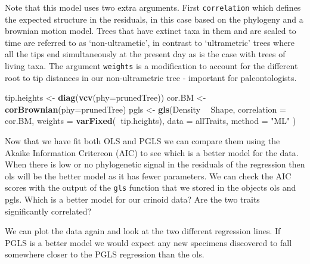 \documentclass[]{article}
\newenvironment{Shaded}{\begin{snugshade}}{\end{snugshade}}
\newcommand{\KeywordTok}[1]{\textcolor[rgb]{0.13,0.29,0.53}{\textbf{#1}}}
\newcommand{\DataTypeTok}[1]{\textcolor[rgb]{0.13,0.29,0.53}{#1}}
\newcommand{\StringTok}[1]{\textcolor[rgb]{0.31,0.60,0.02}{#1}}
\newcommand{\OperatorTok}[1]{\textcolor[rgb]{0.81,0.36,0.00}{\textbf{#1}}}
\newcommand{\NormalTok}[1]{#1}
\begin{document}
Note that this model uses two extra arguments. First
\texttt{correlation} which defines the expected structure in the
residuals, in this case based on the phylogeny and a brownian motion
model. Trees that have extinct taxa in them and are scaled to time are
referred to as `non-ultrametic', in contrast to `ultrametric' trees
where all the tips end simultaneously at the present day as is the case
with trees of living taxa. The argument \texttt{weights} is a
modification to account for the different root to tip distances in our
non-ultrametric tree - important for paleontologists.

\begin{Shaded}
\begin{Highlighting}[]
\NormalTok{tip.heights <-}\StringTok{ }\KeywordTok{diag}\NormalTok{(}\KeywordTok{vcv}\NormalTok{(}\DataTypeTok{phy=}\NormalTok{prunedTree))}
\NormalTok{cor.BM <-}\StringTok{ }\KeywordTok{corBrownian}\NormalTok{(}\DataTypeTok{phy=}\NormalTok{prunedTree)}
\NormalTok{pgls <-}\StringTok{ }\KeywordTok{gls}\NormalTok{(Density }\OperatorTok{~}\StringTok{ }\NormalTok{Shape, }
            \DataTypeTok{correlation =}\NormalTok{ cor.BM, }
            \DataTypeTok{weights =} \KeywordTok{varFixed}\NormalTok{(}\OperatorTok{~}\NormalTok{tip.heights), }
            \DataTypeTok{data =}\NormalTok{ allTraits, }
            \DataTypeTok{method =} \StringTok{"ML"}
\NormalTok{            )}
\end{Highlighting}
\end{Shaded}

Now that we have fit both OLS and PGLS we can compare them using the
Akaike Information Critereon (AIC) to see which is a better model for
the data. When there is low or no phylogenetic signal in the residuals
of the regression then ols will be the better model as it has fewer
parameters. We can check the AIC scores with the output of the
\texttt{gls} function that we stored in the objects ols and pgls. Which
is a better model for our crinoid data? Are the two traits significantly
correlated?

\begin{Shaded}
\end{Shaded}

We can plot the data again and look at the two different regression
lines. If PGLS is a better model we would expect any new specimens
discovered to fall somewhere closer to the PGLS regression than the ols.
\end{document}
